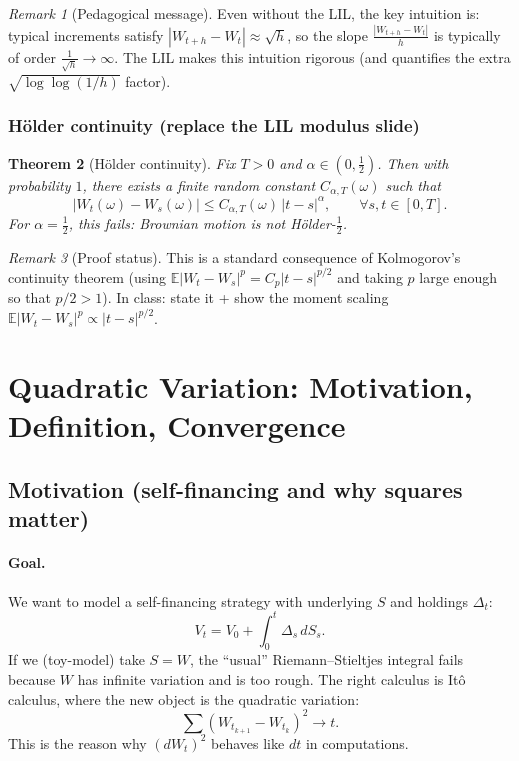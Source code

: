 \documentclass[11pt]{article}
\newtheorem{theorem}{Theorem}[section]
\theoremstyle{definition}
\theoremstyle{remark}
\newtheorem{remark}[theorem]{Remark}
\newcommand{\E}{\mathbb{E}}
\begin{document}
\begin{remark}[Pedagogical message]
Even without the LIL, the key intuition is: typical increments satisfy $|W_{t+h}-W_t|\approx \sqrt{h}$,
so the slope $\frac{|W_{t+h}-W_t|}{h}$ is typically of order $\frac{1}{\sqrt{h}}\to\infty$.
The LIL makes this intuition rigorous (and quantifies the extra $\sqrt{\log\log(1/h)}$ factor).
\end{remark}

\subsubsection{Hölder continuity (replace the LIL modulus slide)}

\begin{theorem}[Hölder continuity]
Fix $T>0$ and $\alpha\in(0,\tfrac12)$. Then with probability $1$, there exists a finite random constant $C_{\alpha,T}(\omega)$ such that
\[
|W_t(\omega)-W_s(\omega)| \le C_{\alpha,T}(\omega)\,|t-s|^{\alpha},
\qquad \forall s,t\in[0,T].
\]
For $\alpha=\tfrac12$, this fails: Brownian motion is not Hölder-$\tfrac12$.
\end{theorem}

\begin{remark}[Proof status]
This is a standard consequence of Kolmogorov's continuity theorem
(using $\E|W_t-W_s|^p = C_p|t-s|^{p/2}$ and taking $p$ large enough so that $p/2>1$).
In class: state it + show the moment scaling $\E|W_t-W_s|^p\propto |t-s|^{p/2}$.
\end{remark}

\section{Quadratic Variation: Motivation, Definition, Convergence}

\subsection{Motivation (self-financing and why squares matter)}

\paragraph{Goal.}
We want to model a self-financing strategy with underlying $S$ and holdings $\Delta_t$:
\[
V_t = V_0 + \int_0^t \Delta_s\, dS_s.
\]
If we (toy-model) take $S=W$, the ``usual'' Riemann–Stieltjes integral fails because $W$ has infinite variation and is too rough.
The right calculus is It\^o calculus, where the new object is the quadratic variation:
\[
\sum (W_{t_{k+1}}-W_{t_k})^2 \longrightarrow t.
\]
This is the reason why $(dW_t)^2$ behaves like $dt$ in computations.
\end{document}

